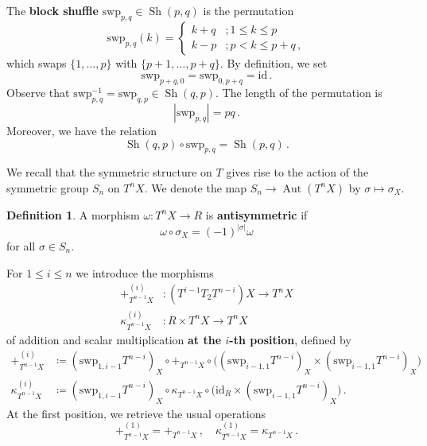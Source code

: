 \documentclass[12pt,reqno, a4paper]{amsart}
\numberwithin{equation}{section}
\theoremstyle{plain}
\theoremstyle{definition}
\newtheorem{Definition}[Theorem]{Definition}
\theoremstyle{remark}
\DeclareMathOperator{\Aut}{Aut}
\DeclareMathOperator{\Shuff}{Sh}
\newcommand{\id}{\mathrm{id}}
\newcommand{\Swp}{\mathrm{swp}}
\begin{document}
The \textbf{block shuffle} $\Swp_{p,q} \in \Shuff(p,q)$ is the permutation
\begin{equation}
\label{eq:ijShuffle}
  \Swp_{p,q}(k)
  =
  \begin{cases}
     k+q &; 1 \leq k \leq p \\
     k-p &; p < k \leq p+q \,,
  \end{cases}
\end{equation}
which swaps $\{1, \ldots, p\}$ with $\{p+1, \ldots, p+q\}$. By definition, we set
\begin{equation*}
 \Swp_{p+q,0} = \Swp_{0,p+q} = \id
 \,.
\end{equation*}
Observe that $\Swp_{p,q}^{-1} = \Swp_{q,p} \in \Shuff(q,p)$. The length of the permutation is
\begin{equation*}
  |\Swp_{p,q}| = pq
  \,.
\end{equation*}
Moreover, we have the relation
\begin{equation}
\label{eq:ShuffSwp}
  \Shuff(q,p)\circ \Swp_{p,q}
  = \Shuff(p,q)
  \,.
\end{equation}

We recall that the symmetric structure on $T$ gives rise to the action of the symmetric group $S_n$ on $T^n X$. We denote the map $S_n \to \Aut(T^n X)$ by $\sigma \mapsto \sigma_X$.

\begin{Definition}
A morphism $\omega\colon T^n X \to R$ is \textbf{antisymmetric} if
\begin{equation*}
  \omega \circ \sigma_X = (-1)^{|\sigma|} \omega
\end{equation*}
for all $\sigma \in S_n$.
\end{Definition}


For $1 \leq i \leq n$ we introduce the morphisms
\begin{align*}
  +^{(i)}_{T^{n-1} X}
  &\colon
  (T^{i-1}T_2 T^{n-i})X \longrightarrow T^n X
  \\
  \kappa^{(i)}_{T^{n-1}X}
  &\colon
  R \times T^n X \longrightarrow T^n X
\end{align*}
of addition and scalar multiplication \textbf{at the $i$-th position}, defined by
\begin{align}
  \label{eq:TaddAti}
  +^{(i)}_{T^{n-1}X}
  &\coloneqq
  (\Swp_{1,i-1}T^{n-i})_X \circ +_{T^{n-1}X} \circ
  \bigl((\Swp_{i-1,1}T^{n-i})_X \times (\Swp_{i-1,1}T^{n-i})_X \bigr)
  \\
  \label{eq:RmultAti}
  \kappa^{(i)}_{T^{n-1}X}
  &\coloneqq
  (\Swp_{1,i-1}T^{n-i})_X \circ \kappa_{T^{n-1}X} \circ \bigl(\id_R \times (\Swp_{i-1,1}T^{n-i})_X \bigr)
  \,.
\end{align}
At the first position, we retrieve the usual operations
\begin{equation*}
  +^{(1)}_{T^{n-1}X} = +_{T^{n-1}X}
  \,,\quad
  \kappa^{(1)}_{T^{n-1}X} = \kappa_{T^{n-1}X}
  \,.
\end{equation*}
\end{document}
